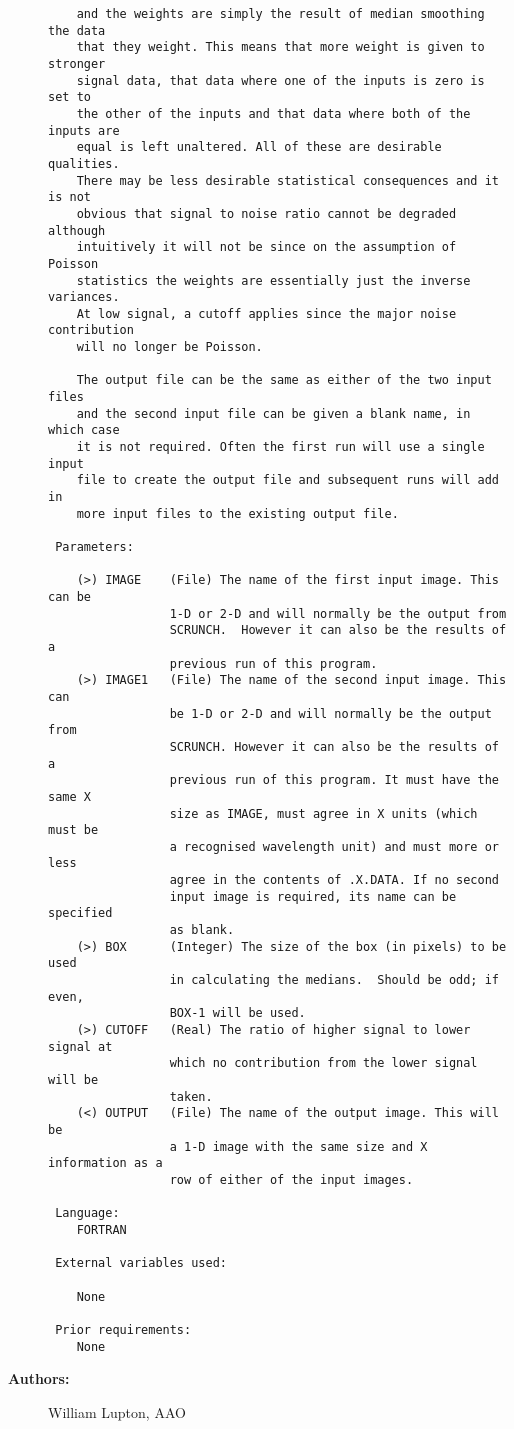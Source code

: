 \begin{description}
\begin{verbatim}
    and the weights are simply the result of median smoothing the data
    that they weight. This means that more weight is given to stronger
    signal data, that data where one of the inputs is zero is set to
    the other of the inputs and that data where both of the inputs are
    equal is left unaltered. All of these are desirable qualities.
    There may be less desirable statistical consequences and it is not
    obvious that signal to noise ratio cannot be degraded although
    intuitively it will not be since on the assumption of Poisson
    statistics the weights are essentially just the inverse variances.
    At low signal, a cutoff applies since the major noise contribution
    will no longer be Poisson.

    The output file can be the same as either of the two input files
    and the second input file can be given a blank name, in which case
    it is not required. Often the first run will use a single input
    file to create the output file and subsequent runs will add in
    more input files to the existing output file.

 Parameters:

    (>) IMAGE    (File) The name of the first input image. This can be
                 1-D or 2-D and will normally be the output from
                 SCRUNCH.  However it can also be the results of a
                 previous run of this program.
    (>) IMAGE1   (File) The name of the second input image. This can
                 be 1-D or 2-D and will normally be the output from
                 SCRUNCH. However it can also be the results of a
                 previous run of this program. It must have the same X
                 size as IMAGE, must agree in X units (which must be
                 a recognised wavelength unit) and must more or less
                 agree in the contents of .X.DATA. If no second
                 input image is required, its name can be specified
                 as blank.
    (>) BOX      (Integer) The size of the box (in pixels) to be used
                 in calculating the medians.  Should be odd; if even,
                 BOX-1 will be used.
    (>) CUTOFF   (Real) The ratio of higher signal to lower signal at
                 which no contribution from the lower signal will be
                 taken.
    (<) OUTPUT   (File) The name of the output image. This will be
                 a 1-D image with the same size and X information as a
                 row of either of the input images.

 Language:
    FORTRAN

 External variables used:

    None

 Prior requirements:
    None

\end{verbatim}

\item [{\bf Authors:}]
 William Lupton, AAO
\end{description}
